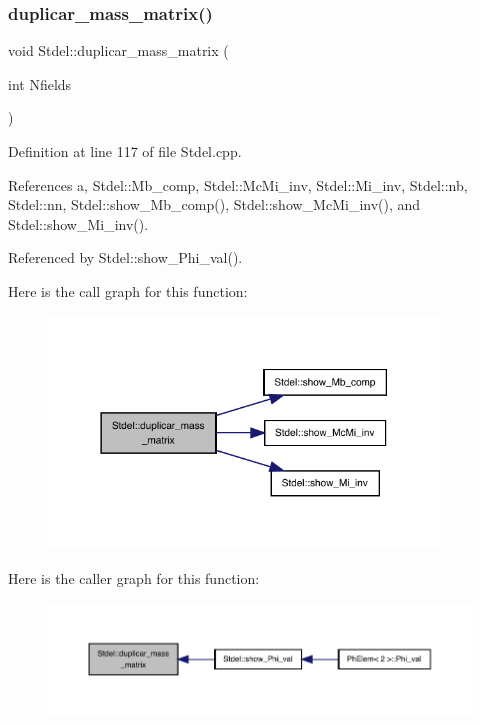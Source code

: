 \subsubsection{\texorpdfstring{duplicar\+\_\+mass\+\_\+matrix()}{duplicar\_mass\_matrix()}}
{\footnotesize\ttfamily void Stdel\+::duplicar\+\_\+mass\+\_\+matrix (\begin{DoxyParamCaption}\item[{int}]{Nfields }\end{DoxyParamCaption})\hspace{0.3cm}{\ttfamily [inherited]}}



Definition at line 117 of file Stdel.\+cpp.



References a, Stdel\+::\+Mb\+\_\+comp, Stdel\+::\+Mc\+Mi\+\_\+inv, Stdel\+::\+Mi\+\_\+inv, Stdel\+::nb, Stdel\+::nn, Stdel\+::show\+\_\+\+Mb\+\_\+comp(), Stdel\+::show\+\_\+\+Mc\+Mi\+\_\+inv(), and Stdel\+::show\+\_\+\+Mi\+\_\+inv().



Referenced by Stdel\+::show\+\_\+\+Phi\+\_\+val().

Here is the call graph for this function\+:
\nopagebreak
\begin{figure}[H]
\begin{center}
\leavevmode
\includegraphics[width=294pt]{classStdel_a922b779be1f8f12b7a5535ab529bff64_cgraph}
\end{center}
\end{figure}
Here is the caller graph for this function\+:
\nopagebreak
\begin{figure}[H]
\begin{center}
\leavevmode
\includegraphics[width=350pt]{classStdel_a922b779be1f8f12b7a5535ab529bff64_icgraph}
\end{center}
\end{figure}
\mbox{\label{classQuadrilateral_a468bd309dfdd1efdb7e58eb795554f0d}} 
